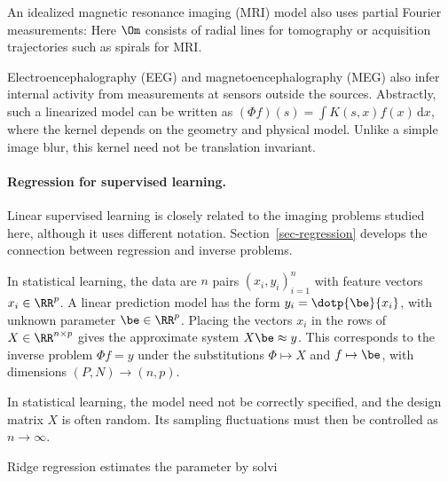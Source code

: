 An idealized magnetic resonance imaging (MRI) model also uses partial Fourier measurements:
Here $\Om$ consists of radial lines for tomography or acquisition trajectories such as spirals for MRI.

Electroencephalography (EEG) and magnetoencephalography (MEG) also infer internal activity from measurements at sensors outside the sources. Abstractly, such a linearized model can be written as $(\Phi f)(s)=\int K(s,x)f(x)\,\mathrm{d}x$, where the kernel depends on the geometry and physical model. Unlike a simple image blur, this kernel need not be translation invariant.

   
\paragraph{Regression for supervised learning.}

Linear supervised learning is closely related to the imaging problems studied here, although it uses different notation. Section~\ref{sec-regression} develops the connection between regression and inverse problems.
 
In statistical learning, the data are $n$ pairs $(x_i,y_i)_{i=1}^n$ with feature vectors $x_i \in \RR^p$. A linear prediction model has the form $y_i = \dotp{\be}{x_i}$, with unknown parameter $\be \in \RR^p$. Placing the vectors $x_i$ in the rows of $X \in \RR^{n \times p}$ gives the approximate system $X \be \approx y$. This corresponds to the inverse problem $\Phi f=y$ under the substitutions $\Phi \mapsto X$ and $f \mapsto \be$, with dimensions $(P,N) \rightarrow (n,p)$.
 
In statistical learning, the model need not be correctly specified, and the design matrix $X$ is often random. Its sampling fluctuations must then be controlled as $n\to\infty$.

Ridge regression estimates the parameter by solvi